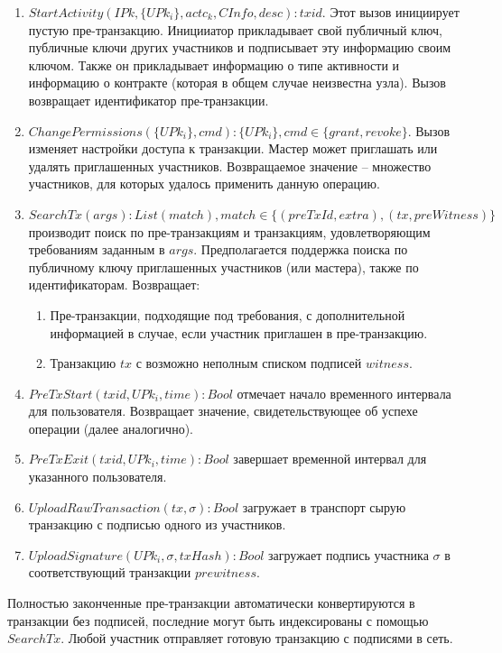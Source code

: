 \documentclass[specification,annotation]{itmo-student-thesis}
\begin{document}
\begin{enumerate}
\item $StartActivity(IPk, \{UPk_i\}, actc_k, CInfo, desc) : txid$. Этот
  вызов инициирует пустую пре-транзакцию. Иницииатор прикладывает свой
  публичный ключ, публичные ключи других участников и подписывает эту
  информацию своим ключом. Также он прикладывает информацию о типе
  активности и информацию о контракте (которая в общем случае
  неизвестна узла). Вызов возвращает идентификатор пре-транзакции.
\item $ChangePermissions(\{UPk_i\}, cmd) : \{UPk_i\}, cmd \in
  \{grant,revoke\}$. Вызов изменяет настройки доступа к
  транзакции. Мастер может приглашать или удалять приглашенных
  участников. Возвращаемое значение -- множество участников, для
  которых удалось применить данную операцию.
\item $SearchTx(args) : List(match), match \in \{(preTxId,extra),
  (tx,preWitness)\}$ производит поиск по пре-транзакциям и транзакциям,
  удовлетворяющим требованиям заданным в $args$. Предполагается
  поддержка поиска по публичному ключу приглашенных участников (или
  мастера), также по идентификаторам. Возвращает:
  \begin{enumerate}
  \item Пре-транзакции, подходящие под требования, с дополнительной
    информацией в случае, если участник приглашен в пре-транзакцию.
  \item Транзакцию $tx$ с возможно неполным списком подписей $witness$.
  \end{enumerate}
\item $PreTxStart(txid, UPk_i, time) : Bool$ отмечает начало
  временного интервала для пользователя. Возвращает значение,
  свидетельствующее об успехе операции (далее аналогично).
\item $PreTxExit(txid, UPk_i, time) : Bool$ завершает временной
  интервал для указанного пользователя.
\item $UploadRawTransaction(tx, \sigma) : Bool$ загружает в транспорт
  сырую транзакцию с подписью одного из участников.
\item $UploadSignature(UPk_i, \sigma, txHash) : Bool$ загружает
  подпись участника $\sigma$ в соответствующий транзакции
  $prewitness$.
\end{enumerate}

Полностью законченные пре-транзакции автоматически конвертируются в
транзакции без подписей, последние могут быть индексированы с помощью
$SearchTx$. Любой участник отправляет готовую транзакцию с подписями в
сеть.
\end{document}
